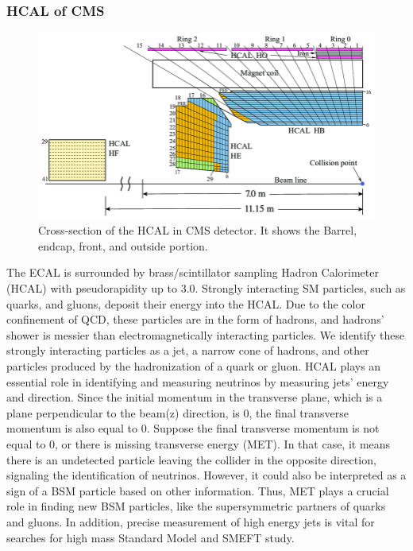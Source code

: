 \subsubsection{HCAL of CMS}
\begin{figure}[h!]
  \caption{Cross-section of the HCAL in CMS detector. It shows the Barrel, endcap, front, and outside portion. \cite{hcal}}
  \label{fig:HCAL}
  \centering
  \includegraphics[width=0.87\linewidth]{figs/HCAL.png}
\end{figure}
The ECAL is surrounded by brass/scintillator sampling Hadron Calorimeter (HCAL) with pseudorapidity up to 3.0.
Strongly interacting SM particles, such as quarks, and gluons, deposit their energy into the HCAL.
Due to the color confinement of QCD, these particles are in the form of hadrons, and hadrons' shower is messier than electromagnetically interacting particles.
We identify these strongly interacting particles as a jet, a narrow cone of hadrons, and other particles produced by the hadronization of a quark or gluon.
HCAL plays an essential role in identifying and measuring neutrinos by measuring jets' energy and direction.
Since the initial momentum in the transverse plane, which is a plane perpendicular to the beam(z) direction, is 0, the final transverse momentum is also equal to 0.
Suppose the final transverse momentum is not equal to 0, or there is missing transverse energy (MET). In that case, it means there is an undetected particle leaving the collider in the opposite direction, signaling the identification of neutrinos.
However, it could also be interpreted as a sign of a BSM particle based on other information.
Thus, MET plays a crucial role in finding new BSM particles, like the supersymmetric partners of quarks and gluons.
In addition, precise measurement of high energy jets is vital for searches for high mass Standard Model and SMEFT study.

